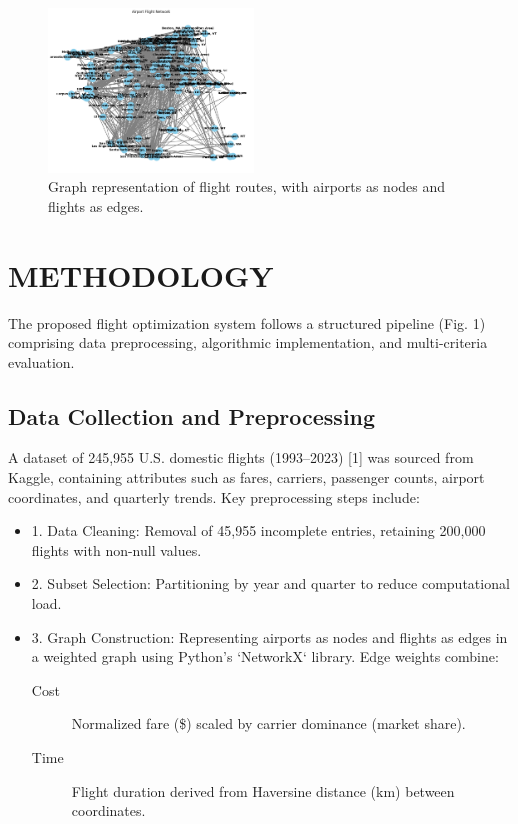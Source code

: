 \documentclass[conference]{IEEEtran}
\begin{document}
\begin{figure}[htbp]
    \centering
    \includegraphics[width=0.486\textwidth]{graph.png} %
    \caption{Graph representation of flight routes, with airports as nodes and flights as edges.}
    \label{fig:graph}
\end{figure}

\section{METHODOLOGY}
The proposed flight optimization system follows a structured pipeline (Fig. 1) comprising data preprocessing, algorithmic implementation, and multi-criteria evaluation.  
\subsection{Data Collection and Preprocessing}
A dataset of 245,955 U.S. domestic flights (1993–2023) [1] was sourced from Kaggle, containing attributes such as fares, carriers, passenger counts, airport coordinates, and quarterly trends. Key preprocessing steps include:  
\begin{itemize}
    \item 1. Data Cleaning: Removal of 45,955 incomplete entries, retaining 200,000 flights with non-null values.  
    \item 2. Subset Selection: Partitioning by year and quarter to reduce computational load.  
    \item 3. Graph Construction: Representing airports as nodes and flights as edges in a weighted graph using Python’s `NetworkX` library. Edge weights combine:  
    \begin{description}
        \item [Cost] Normalized fare (\$) scaled by carrier dominance (market share).  
        \item [Time] Flight duration derived from Haversine distance (km) between coordinates.  
    \end{description}   

\end{itemize}
\end{document}

